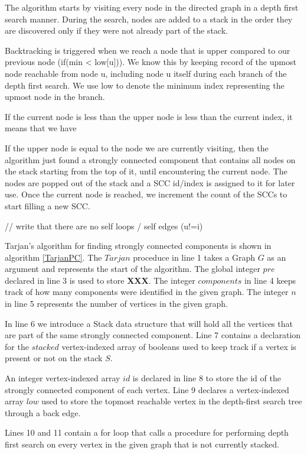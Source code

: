 \documentclass{l4proj}
\begin{document}
\noindent The algorithm starts by visiting every node in the directed graph in a depth first search manner. During the search, nodes are added to a stack in the order they are discovered only if they were not already part of the stack. 

\noindent Backtracking is triggered when we reach a node that is upper compared to our previous node (if(min < low[u])).  We know this by keeping record of the upmost node reachable from node u, including node u itself during each branch of the depth first search. We use low to denote the minimum index representing the upmost node in the branch.

\noindent If the current node is less than the upper node is less than the current index, it means that we have 

\noindent If the upper node is equal to the node we are currently visiting, then the algorithm just found a strongly connected component that contains all nodes on the stack starting from the top of it, until encountering the current node. The nodes are popped out of the stack and a SCC id/index is assigned to it for later use. Once the current node is reached, we increment the count of the SCCs to start filling a new SCC.

\noindent // write that there are no self loops / self edges (u!=i)
\cite{tarjan1972depth}


\noindent Tarjan's algorithm for finding strongly connected components is shown in algorithm \ref{TarjanPC}. The $Tarjan$ proceduce in line 1 takes a Graph $G$ as an argument and represents the start of the algorithm. The global integer $pre$ declared in line 3 is used to store \textbf{XXX}. The integer $components$ in line 4 keeps track of how many components were identified in the given graph. The integer $n$ in line 5 represents the number of vertices in the given graph.

\noindent In line 6 we introduce a Stack data structure that will hold all the vertices that are part of the same strongly connected component. Line 7 contains a declaration for the $stacked$ vertex-indexed array of booleans used to keep track if a vertex is present or not on the stack $S$.

\noindent An integer vertex-indexed array $id$ is declared in line 8 to store the id of the strongly connected component of each vertex. Line 9 declares a vertex-indexed array $low$ used to store the topmost reachable vertex in the depth-first search tree through a back edge.

\noindent Lines 10 and 11 contain a for loop that calls a procedure for performing depth first search on every vertex in the given graph that is not currently stacked.
\end{document}
